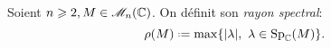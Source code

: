 \begin{defi}
    Soient $n \geqslant 2, M \in \mathscr{M}_n(\mathbb{C})$. On définit son \emph{rayon spectral}:
    $$\rho(M) \defeq \max \{ |\lambda |,\ \lambda \in \Sp_{\C}(M) \}.$$
\end{defi}